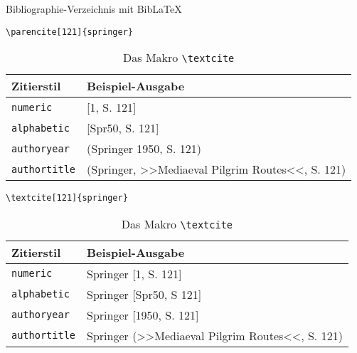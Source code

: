 \begin{frame}[fragile]{Bibliographie-Verzeichnis mit Bib\LaTeX}
\begin{lstlisting}[style=tex]
\parencite[121]{springer}
\end{lstlisting}
\begin{table}
	\caption{Das Makro \texttt{\textbackslash parencite}}
\begin{tabular}{ll}
	\hline
	Zitierstil & Beispiel-Ausgabe \\
	\hline
	\texttt{numeric} & [1, S. 121] \\
	\texttt{alphabetic} & [Spr50, S. 121] \\
	\texttt{authoryear} & (Springer 1950, S. 121) \\
	\texttt{authortitle} & (Springer, >>Mediaeval Pilgrim Routes<<, S. 121) \\
	\hline
\end{tabular}
\begin{lstlisting}[style=tex]
\textcite[121]{springer}
\end{lstlisting}
\begin{table}
	\caption{Das Makro \texttt{\textbackslash textcite}}
	\begin{tabular}{ll}
		\hline
		Zitierstil & Beispiel-Ausgabe \\
		\hline
		\texttt{numeric} & Springer [1, S. 121] \\
		\texttt{alphabetic} & Springer [Spr50, S 121] \\
		\texttt{authoryear} & Springer [1950, S. 121] \\
		\texttt{authortitle} & Springer (>>Mediaeval Pilgrim Routes<<, S. 121) \\
		\hline
	\end{tabular}
\end{table}
\end{table}

\end{frame}



